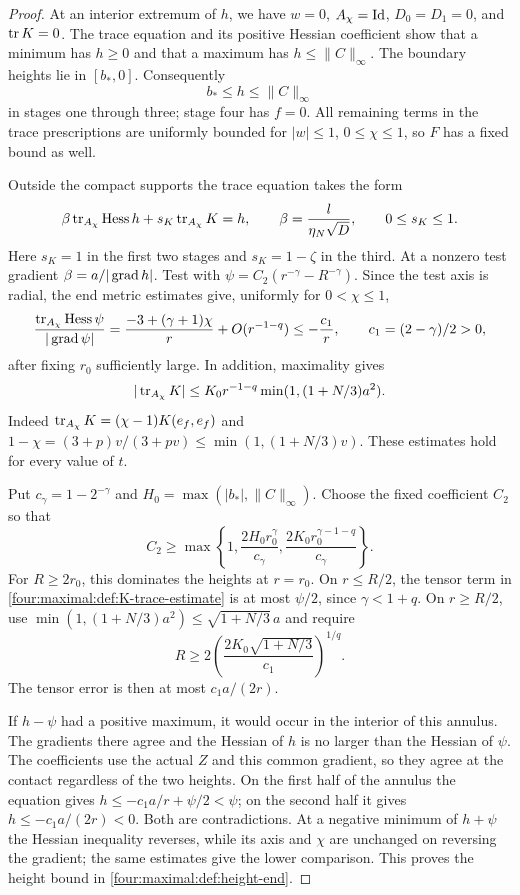 \begin{proof}
At an interior extremum of $h$, we have $w=0$, $A_\chi=\operatorname{Id}$,
$D_0=D_1=0$, and $\operatorname{tr} K=0$.  The trace equation and its positive
Hessian coefficient show that a minimum has $h\ge0$ and that a maximum
has $h\le\|C\|_\infty$.  The boundary heights lie in $[b_*,0]$.
Consequently
\begin{equation}\label{four:maximal:def:height-range}
 b_*\le h\le\|C\|_\infty
\end{equation}
in stages one through three; stage four has $f=0$.
All remaining terms in the trace prescriptions are uniformly bounded
for $|w|\le1$, $0\le\chi\le1$, so $F$ has a fixed bound as well.

Outside the compact supports the trace equation takes the form
\[
 \beta\operatorname{tr}_{A_\chi}\operatorname{Hess} h+s_K\operatorname{tr}_{A_\chi}K=h,
 \qquad \beta=\frac{l}{\eta_N\sqrt D},\qquad 0\le s_K\le1.
\]
Here $s_K=1$ in the first two stages and $s_K=1-\zeta$ in the third.
At a nonzero test gradient $\beta=a/|\operatorname{grad} h|$.
Test with $\psi=C_2(r^{-\gamma}-R^{-\gamma})$.  Since the test axis is
radial, the end metric estimates give, uniformly for $0<\chi\le1$,
\[
 \frac{\operatorname{tr}_{A_\chi}\operatorname{Hess}\psi}{|\operatorname{grad}\psi|}
 =\frac{-3+(\gamma+1)\chi}{r}+O(r^{-1-q})
 \le-\frac{c_1}{r},\qquad c_1=(2-\gamma)/2>0,
\]
after fixing $r_0$ sufficiently large.  In addition, maximality gives
\begin{equation}\label{four:maximal:def:K-trace-estimate}
 |\operatorname{tr}_{A_\chi}K|
 \le K_0r^{-1-q}\min(1,(1+N/3)a^2).
\end{equation}
Indeed $\operatorname{tr}_{A_\chi}K=(\chi-1)K(e_f,e_f)$ and
$1-\chi=(3+p)v/(3+pv)\le\min(1,(1+N/3)v)$.
These estimates hold for every value of $t$.

Put $c_\gamma=1-2^{-\gamma}$ and
$H_0=\max(|b_*|,\|C\|_\infty)$.  Choose the fixed coefficient $C_2$ so that
\[
 C_2\ge\max\left\{1,
 \frac{2H_0r_0^\gamma}{c_\gamma},
 \frac{2K_0r_0^{\gamma-1-q}}{c_\gamma}\right\}.
\]
For $R\ge2r_0$, this dominates the heights at $r=r_0$.
On $r\le R/2$, the tensor term in \eqref{four:maximal:def:K-trace-estimate} is at
most $\psi/2$, since $\gamma<1+q$.  On $r\ge R/2$, use
$\min(1,(1+N/3)a^2)\le\sqrt{1+N/3}\,a$ and require
\[
 R\ge2\left(\frac{2K_0\sqrt{1+N/3}}{c_1}\right)^{1/q}.
\]
The tensor error is then at most $c_1a/(2r)$.

If $h-\psi$ had a positive maximum, it would occur in the interior of
this annulus.  The gradients there agree and the Hessian of $h$ is no
larger than the Hessian of $\psi$.  The coefficients use the actual $Z$
and this common gradient, so they agree at the contact regardless of
the two heights.  On the first half of the annulus the equation gives
$h\le-c_1a/r+\psi/2<\psi$; on the second half it gives
$h\le-c_1a/(2r)<0$.  Both are contradictions.
At a negative minimum of $h+\psi$ the Hessian inequality reverses,
while its axis and $\chi$ are unchanged on reversing the gradient;
the same estimates give the lower comparison.  This proves the height
bound in \eqref{four:maximal:def:height-end}.


\end{proof}
